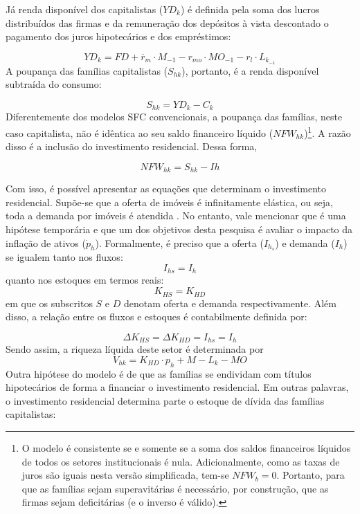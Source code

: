 Já renda disponível dos capitalistas ($YD_k$) é definida pela soma dos lucros distribuídos das firmas e da remuneração dos depósitos à vista descontado o pagamento dos juros hipotecários e dos empréstimos:

\begin{equation}
    \label{EqYD}
    YD_k = FD + \overline r_m\cdot M_{-1} - r_{mo}\cdot MO_{-1} - r_{l}\cdot L_{k_{-1}}
\end{equation}
A poupança das famílias capitalistas ($S_{hk}$), portanto, é a renda disponível subtraída do consumo:

\begin{equation}
    \label{EqSh}
    S_{hk} = YD_k - C_k
\end{equation}
Diferentemente dos modelos SFC convencionais, a poupança das famílias, neste caso capitalista,  não é idêntica ao seu saldo financeiro líquido ($NFW_{hk}$)\footnote{O modelo é consistente se e somente se a soma dos saldos financeiros líquidos de todos os setores institucionais é nula. Adicionalmente, como as taxas de juros são iguais nesta versão simplificada, tem-se $NFW_b = 0$. Portanto, para que as famílias sejam superavitárias é necessário, por construção, que as firmas sejam deficitárias (e o inverso é válido).
}. A razão disso é a inclusão do investimento residencial. Dessa forma, 

\begin{equation}
\label{NFWh}
    NFW_{hk} = S_{hk} - Ih
\end{equation}

Com isso, é possível apresentar as equações que determinam o investimento residencial. Supõe-se que a oferta de imóveis é infinitamente elástica, ou seja, toda a demanda por imóveis é atendida \cite[p.~141--145]{duesenberry_investment_1958}. No entanto, vale mencionar que é uma hipótese temporária e que um dos objetivos desta pesquisa é avaliar o impacto da inflação de ativos ($\dot p_h$). Formalmente, é preciso que a oferta ($I_{h_s}$) e demanda ($I_h$) se igualem tanto nos fluxos:
\begin{equation}
    I_{hs} = I_h
\end{equation}
quanto nos estoques em termos reais:
\begin{equation}
    K_{HS} = K_{HD}
\end{equation}
em que os subscritos $S$ e $D$ denotam oferta e demanda respectivamente. Além disso, a relação entre os fluxos e estoques é contabilmente definida por:

\begin{equation}
    \Delta K_{HS} = \Delta K_{HD} = I_{hs} = I_h
\end{equation}
Sendo assim, a riqueza líquida deste setor é determinada por
\begin{equation}
V_{hk} = K_{HD}\cdot p_h + M - L_k - MO
\end{equation}
Outra hipótese do modelo é de que as famílias se endividam com títulos hipotecários de forma a financiar o investimento residencial. Em outras palavras, o investimento residencial determina parte o estoque de dívida das famílias capitalistas:

